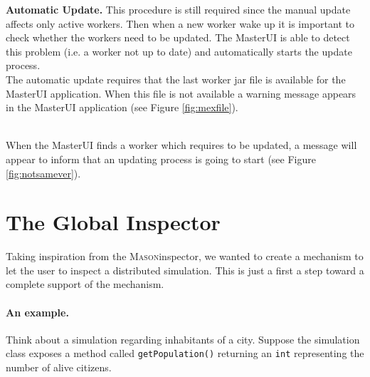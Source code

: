 \documentclass{article}
\def\ma{\textsc{Mason}}
\begin{document}
\textbf{Automatic Update.} This procedure is still required since the manual update affects only active workers. Then when a new worker wake up it is important to check whether the workers need to be updated. The MasterUI is able to detect this problem (i.e. a worker not up to date) and automatically starts the update process.\\
The automatic update requires that the last worker jar file is available for the MasterUI application. When this file is not available a warning message appears in the MasterUI application (see Figure \ref{fig:mexfile}).
\begin{figure}[h]
\end{figure}\\
When the MasterUI finds a worker which requires to be updated, a message will appear to inform that an updating process is going to start (see Figure \ref{fig:notsamever}).
\begin{figure}[h!]
\end{figure}

\newpage
\section{The Global Inspector}

Taking inspiration from the \ma inspector, we wanted to create a mechanism to let the user to inspect a distributed simulation. This is just a first a step toward a complete support of the mechanism.

\paragraph*{An example.}
Think about a simulation regarding inhabitants of a city. Suppose the simulation class exposes a method called \texttt{getPopulation()} returning an \texttt{int} representing the number of alive citizens.
\end{document}
